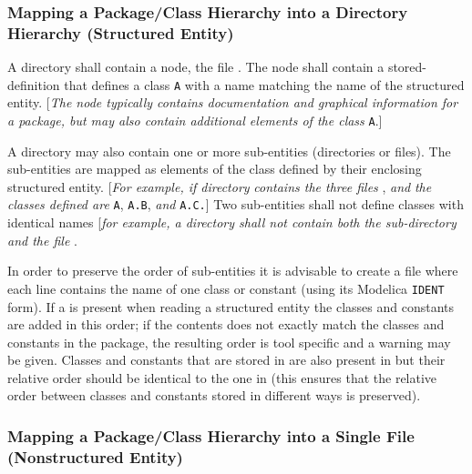 \subsubsection{Mapping a Package/Class Hierarchy into a Directory Hierarchy (Structured Entity)}

A directory shall contain a node, the file . The node shall contain a stored-definition that defines a class \lstinline!A! with a name
matching the name of the structured entity. {[}\emph{The node typically
contains documentation and graphical information for a package, but may
also contain additional elements of the class} \lstinline!A!.{]}

A directory may also contain one or more sub-entities (directories or
files). The sub-entities are mapped as elements of the class defined by
their enclosing structured entity. {[}\emph{For example, if directory} 
\emph{contains the three files} ,  \emph{and}
\emph{the classes defined are} \lstinline!A!, \lstinline!A.B!, \emph{and} \lstinline!A.C.!{]} Two
sub-entities shall not define classes with identical names {[}\emph{for
example, a directory shall not contain both the sub-directory} 
\emph{and the file} \filename{A.mo}{]}.

In order to preserve the order of sub-entities it is advisable to create
a file  where each line contains the name of one class or
constant (using its Modelica \lstinline!IDENT! form). If a  is present when reading a structured entity
the classes and constants are added in this order; if the contents does
not exactly match the classes and constants in the package, the
resulting order is tool specific and a warning may be given. Classes and
constants that are stored in  are also present in
 but their relative order should be identical to the one in
 (this ensures that the relative order between classes and
constants stored in different ways is preserved).

\subsubsection{Mapping a Package/Class Hierarchy into a Single File (Nonstructured Entity)}

